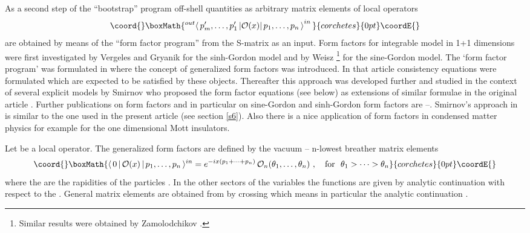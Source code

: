 \documentclass[a4paper,a4paper]{article}
\begin{document}
As a second step of the ``bootstrap'' program off-shell quantities as
arbitrary matrix elements of local operators 
\[\coord{}\boxMath{
^{out}\left\langle \,p_{m}^{\prime },\ldots ,p_{1}^{\prime }\left| \mathcal{O%
}(x)\right| p_{1},\ldots ,p_{n}\,\right\rangle ^{in}\, 
}{corchetes}{0pt}\coordE{}\]
are obtained by means of the ``form factor program'' from the S-matrix as an
input. Form factors for integrable model in 1+1 dimensions were first
investigated by Vergeles and Gryanik \cite{VG} for the sinh-Gordon model and
by Weisz \cite{W}\footnote{%
Similar results were obtained by Zamolodchikov \cite{Za1}.} for the
sine-Gordon model. The `form factor program' was formulated in \cite{KW,BKW}
where the concept of generalized form factors was introduced. In that
article consistency equations were formulated which are expected to be
satisfied by these objects. Thereafter this approach was developed further
and studied in the context of several explicit models by Smirnov \cite{Sm}
who proposed the form factor equations (see below) as extensions of similar
formulae in the original article \cite{KW}. Further publications on form
factors and in particular on sine-Gordon and sinh-Gordon form factors are 
\cite{Sm1}--\cite{CF}. Smirnov's approach in \cite{Sm1} is similar to the
one used in the present article (see section \ref{s6}). Also there is a nice
application \cite{GNT,CET} of form factors in condensed matter physics for
example for the one dimensional Mott insulators.

Let \coordHE{} be a local operator. The generalized form factors \coordHE{} are defined by the vacuum
-- n-lowest breather matrix elements 
\[\coord{}\boxMath{
\langle \,0\,|\,\mathcal{O}(x)\,|\,p_{1},\dots ,p_{n}\,\rangle
^{in}=e^{-ix(p_{1}+\dots +p_{n})}\,\mathcal{O}_{n}(\theta _{1},\dots ,\theta
_{n})~,~~~\mathrm{for}~~\theta _{1}>\dots >\theta _{n} 
}{corchetes}{0pt}\coordE{}\]
where the \coordHE{} are the rapidities of the particles \coordHE{}. In the other sectors of the
variables the functions \coordHE{}
are given by analytic continuation with respect to the \coordHE{}.
General matrix elements are obtained from \coordHE{} by crossing which means in particular the analytic continuation \coordHE{}.
\end{document}
